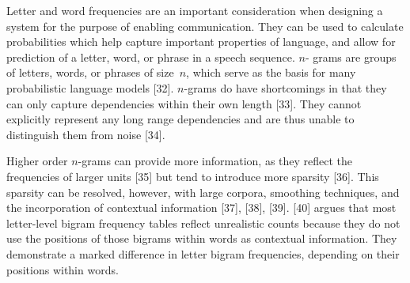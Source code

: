 \documentclass[12pt,titlepage]{article}
\begin{document}
Letter and word frequencies are an important consideration when designing a system for the purpose of 
enabling communication.  They can be used to calculate probabilities which help capture important 
properties of language, and allow for prediction of a letter, word, or phrase in a speech sequence.  $n$- 
grams are groups of letters, words, or phrases of size~$n$, which serve as the basis for many probabilistic 
language models [32].  $n$-grams do have shortcomings in that they can only capture dependencies within 
their own length [33].  They cannot explicitly represent any long range dependencies and are thus unable 
to distinguish them from noise [34].

Higher order $n$-grams can provide more information, as they reflect the frequencies of larger units [35] 
but tend to introduce more sparsity [36].  This sparsity can be resolved, however, with large corpora, 
smoothing techniques, and the incorporation of contextual information [37], [38], [39].  [40] argues that most letter-level
bigram frequency tables reflect unrealistic counts because they do not use the positions of  those 
bigrams within words as contextual information.  They demonstrate a marked difference in letter 
bigram frequencies, depending on their positions within words.
\end{document}
